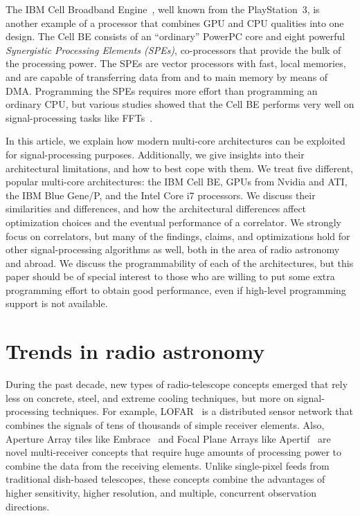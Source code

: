 \documentclass{article}
\begin{document}
The IBM Cell Broadband Engine~\cite{Gschwind:06}, well known from the
PlayStation~3, is another example of a processor that combines GPU and CPU
qualities into one design.
The Cell BE consists of an ``ordinary'' PowerPC core and eight powerful
\emph{Synergistic Processing Elements (SPEs)}, co-processors that provide
the bulk of the processing power.
The SPEs are vector processors with fast, local memories, and are capable
of transferring data from and to main memory by means of DMA.
Programming the SPEs requires more effort than programming an ordinary CPU,
but various studies showed that the Cell BE performs very well on
signal-processing tasks like FFTs~\cite{?}.

In this article, we explain how modern multi-core architectures can be
exploited for signal-processing purposes.
Additionally, we give insights into their architectural limitations, and how
to best cope with them.
We treat five different, popular multi-core architectures: the IBM Cell BE,
GPUs from Nvidia and ATI, the IBM Blue Gene/P, and
the Intel Core i7 processors.
We discuss their similarities and differences, and how the architectural
differences affect optimization choices and the eventual performance of a
correlator.
We strongly focus on correlators, but many of the findings, claims, and
optimizations hold for other signal-processing algorithms as well, both in the
area of radio astronomy and abroad.
We discuss the programmability of each of the architectures, but this paper
should be of special interest to those who are willing to put some extra
programming effort to obtain good performance, even if high-level programming
support is not available.


\section{Trends in radio astronomy}

During the past decade, new types of radio-telescope concepts emerged that
rely less on concrete, steel, and extreme cooling techniques, but more on
signal-processing techniques.
For example, LOFAR~\cite{Butcher:04,deVos:09} is a distributed sensor network
that combines the signals of tens of thousands of simple receiver elements.
Also, Aperture Array tiles like Embrace~\cite{?} and Focal Plane Arrays
like Apertif~\cite{?} are novel multi-receiver concepts that require huge
amounts of processing power to combine the data from the receiving elements.
Unlike single-pixel feeds from traditional dish-based telescopes, these
concepts combine the advantages of higher sensitivity, higher resolution,
and multiple, concurrent observation directions.
\end{document}
